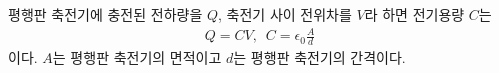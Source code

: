 \documentclass[tightenlines,floatfix,nofootinbib,superscriptaddress,fleqn]{revtex4}
\begin{document}
평행판 축전기에 충전된 전하량을 $Q$, 축전기 사이 전위차를 $V$라 하면 전기용량 $C$는
\begin{align}
  Q = CV,\,\,\,C = \epsilon_0\frac{A}{d}
\end{align}
이다. $A$는 평행판 축전기의 면적이고 $d$는 평행판 축전기의 간격이다.
\\

\\

\\

\\

\\

\\

\\

\end{document}
